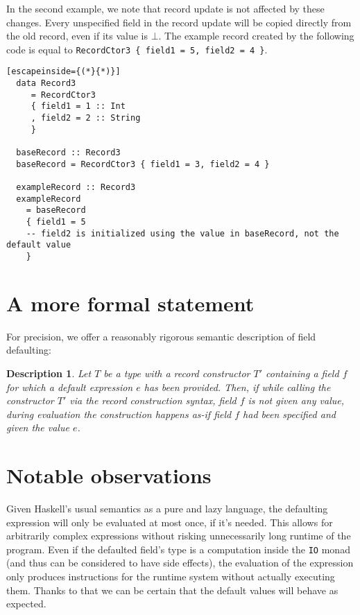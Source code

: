 \documentclass[en]{pracamgr}
\begin{document}
In the second example, we note that record update is not affected by these changes. 
Every unspecified field in the record update will be copied directly from the old record, even if its value is $\bot$.
The example record created by the following code is equal to \texttt{RecordCtor3 \{ field1 = 5, field2 = 4 \}}.

\begin{lstlisting}[escapeinside={(*}{*)}]
  data Record3
     = RecordCtor3
     { field1 = 1 :: Int
     , field2 = 2 :: String
     }  

  baseRecord :: Record3
  baseRecord = RecordCtor3 { field1 = 3, field2 = 4 }

  exampleRecord :: Record3
  exampleRecord 
    = baseRecord
    { field1 = 5
    -- field2 is initialized using the value in baseRecord, not the default value
    }

\end{lstlisting}

\section{A more formal statement}
For precision, we offer a reasonably rigorous semantic description of field defaulting:
\newtheorem{remark}{Description}
\begin{remark}
  \normalfont
  Let $T$ be a type with a record constructor $T'$ containing a field $f$ for which a default expression $e$ has been provided.
  Then, if while calling the constructor $T'$ via the record construction syntax, field $f$ is not given any value, during evaluation the construction happens \textit{as-if} field $f$ had been specified and given the value $e$.
\end{remark}

\section{Notable observations}
Given Haskell's usual semantics as a pure and lazy language, the defaulting expression will only be evaluated at most once, if it's needed.
This allows for arbitrarily complex expressions without risking unnecessarily long runtime of the program. 
Even if the defaulted field's type is a computation inside the \texttt{IO} monad (and thus can be considered to have side effects), the evaluation of the expression only produces instructions for the runtime system without actually executing them.
Thanks to that we can be certain that the default values will behave as expected.
\end{document}
